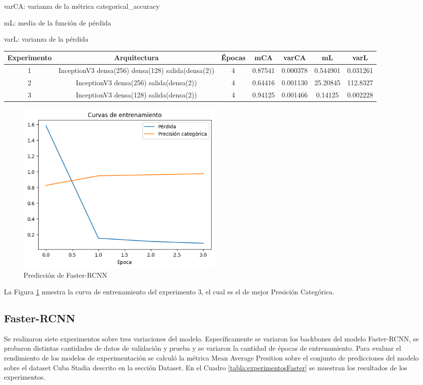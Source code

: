 \documentclass[article]{llncs}
\begin{document}
varCA: varianza de la métrica categorical\_accuracy  

mL: media de la función de pérdida

varL: varianza de la pérdida

\begin{table}[h]
    \centering
    \begin{tabular}{|c|c|c|c|c|c|c|}
    \hline
    Experimento & Arquitectura & Épocas & mCA & varCA & mL & varL \\
    \hline
    1 & InceptionV3 densa(256) densa(128) salida(densa(2)) & 4 & 0.87541 & 0.000378 & 0.544901 & 0.031261 \\
    2 & InceptionV3 densa(256) salida(densa(2)) & 4 & 0.64416 & 0.001130 & 25.20845 & 112.8327 \\
    3 & InceptionV3 densa(128) salida(densa(2)) & 4 & 0.94125 & 0.001466 & 0.14125 & 0.002228 \\
    \hline
    \end{tabular}
\end{table}

\begin{figure}[h]
    \centering
    \includegraphics[width=0.5\textwidth]{3.png}
    \caption{Predicci\'on de Faster-RCNN}
    \label{fig:Figure_3exp}
\end{figure}

La Figura \ref{fig:Figure_3exp} muestra la curva de entrenamiento del experimento 3, el cual es el de mejor Presici\'on Categ\'orica.

\subsection{Faster-RCNN}
Se realizaron siete experimentos sobre tres variaciones del modelo. Espec\'ificamente se variaron los backbones del 
modelo Faster-RCNN, se probaron distintas cantidades de datos de validaci\'on y prueba y se variaron la cantidad de \'epocas 
de entrenamiento. Para evaluar el rendimiento de los modelos de experimentación se calcul\'o la m\'etrica Mean Average Presition sobre el conjunto 
de predicciones del modelo sobre el dataset Cuba Stadia descrito en la secci\'on Dataset.  En el Cuadro \ref{tabla:experimentosFaster} se muestran los resultados de los experimentos.
\end{document}
